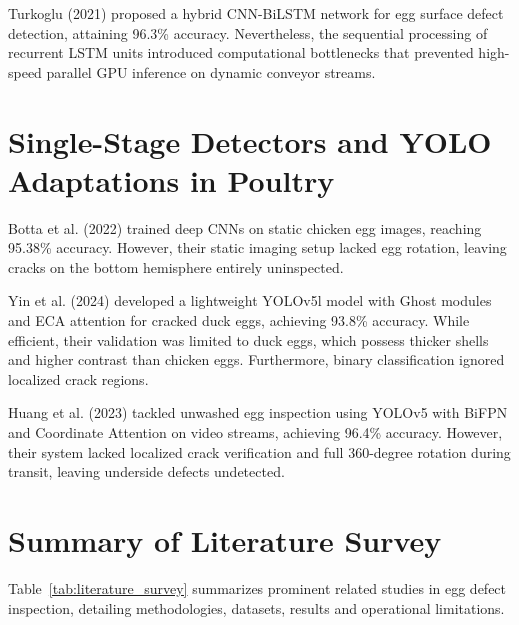 \documentclass[12pt,a4paper]{report}
\begin{document}
Turkoglu (2021) proposed a hybrid CNN-BiLSTM network for egg surface defect detection, attaining 96.3\% accuracy. Nevertheless, the sequential processing of recurrent LSTM units introduced computational bottlenecks that prevented high-speed parallel GPU inference on dynamic conveyor streams.

\section{Single-Stage Detectors and YOLO Adaptations in Poultry}

Botta et al. (2022) trained deep CNNs on static chicken egg images, reaching 95.38\% accuracy. However, their static imaging setup lacked egg rotation, leaving cracks on the bottom hemisphere entirely uninspected.

Yin et al. (2024) developed a lightweight YOLOv5l model with Ghost modules and ECA attention for cracked duck eggs, achieving 93.8\% accuracy. While efficient, their validation was limited to duck eggs, which possess thicker shells and higher contrast than chicken eggs. Furthermore, binary classification ignored localized crack regions.

Huang et al. (2023) tackled unwashed egg inspection using YOLOv5 with BiFPN and Coordinate Attention on video streams, achieving 96.4\% accuracy. However, their system lacked localized crack verification and full 360-degree rotation during transit, leaving underside defects undetected.

\section{Summary of Literature Survey}

Table~\ref{tab:literature_survey} summarizes prominent related studies in egg defect inspection, detailing methodologies, datasets, results and operational limitations.
\end{document}
